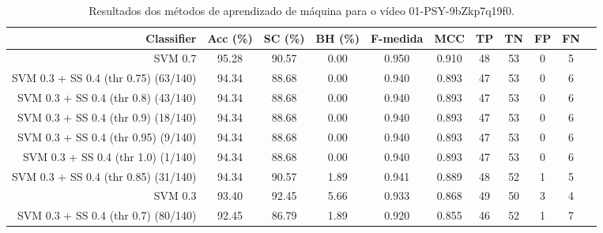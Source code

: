 \begin{table}[!htb]
\centering
\caption{Resultados dos métodos de aprendizado de máquina para o vídeo 01-PSY-9bZkp7q19f0.}
\label{tab:01-PSY-9bZkp7q19f0}
\begin{tabular}{r|c|c|c|c|c|c|c|c|c|c}
\hline\hline
Classifier & Acc (\%) & SC (\%) & BH (\%) & F-medida & MCC & TP & TN & FP & FN \\ \hline
SVM 0.7 & 95.28 & 90.57 & 0.00 & 0.950 & 0.910 & 48 & 53 & 0 & 5 \\ 
SVM 0.3 + SS 0.4 (thr 0.75) (63/140) & 94.34 & 88.68 & 0.00 & 0.940 & 0.893 & 47 & 53 & 0 & 6 \\ 
SVM 0.3 + SS 0.4 (thr 0.8) (43/140) & 94.34 & 88.68 & 0.00 & 0.940 & 0.893 & 47 & 53 & 0 & 6 \\ 
SVM 0.3 + SS 0.4 (thr 0.9) (18/140) & 94.34 & 88.68 & 0.00 & 0.940 & 0.893 & 47 & 53 & 0 & 6 \\ 
SVM 0.3 + SS 0.4 (thr 0.95) (9/140) & 94.34 & 88.68 & 0.00 & 0.940 & 0.893 & 47 & 53 & 0 & 6 \\ 
SVM 0.3 + SS 0.4 (thr 1.0) (1/140) & 94.34 & 88.68 & 0.00 & 0.940 & 0.893 & 47 & 53 & 0 & 6 \\ 
SVM 0.3 + SS 0.4 (thr 0.85) (31/140) & 94.34 & 90.57 & 1.89 & 0.941 & 0.889 & 48 & 52 & 1 & 5 \\ 
SVM 0.3 & 93.40 & 92.45 & 5.66 & 0.933 & 0.868 & 49 & 50 & 3 & 4 \\ 
SVM 0.3 + SS 0.4 (thr 0.7) (80/140) & 92.45 & 86.79 & 1.89 & 0.920 & 0.855 & 46 & 52 & 1 & 7 \\ 
\hline\hline
\end{tabular}
\end{table}
